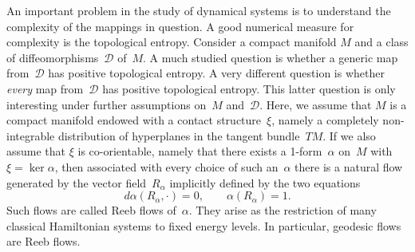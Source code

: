 \documentclass{amsart}
\theoremstyle{definition}
\newtheorem{definition}[proposition]{Definition}
\theoremstyle{remark}
\numberwithin{equation}{section}
\begin{document}
%
%
%

An important problem in the study of dynamical systems is to understand 
the complexity of the mappings in question.
A good numerical measure for complexity is the topological entropy.
Consider a compact manifold $M$ and a class of diffeomorphisms~$\mathcal D$
of~$M$. A much studied question is whether a generic map from~$\mathcal D$
has positive topological entropy. 
A very different question is whether {\it every}\/ map from~$\mathcal D$
has positive topological entropy. 
This latter question is only interesting under further assumptions on~$M$ and~$\mathcal D$.
Here, we assume that $M$ is a compact manifold endowed with a contact structure~$\xi$, namely a completely
non-integrable distribution of hyperplanes in the tangent bundle~$TM$.
If we also assume that $\xi$ is co-orientable, namely that there exists a 1-form~$\alpha$ on~$M$
with $\xi = \ker \alpha$, then associated with every choice of such an~$\alpha$ there is a natural flow
generated by the vector field~$R_\alpha$ implicitly defined
by the two equations
%
$$
d\alpha (R_{\alpha}, \cdot) = 0, \qquad \alpha (R_\alpha) = 1.
$$
Such flows are called Reeb flows of~$\alpha$.
They arise as the restriction of many classical Hamiltonian systems to fixed energy levels.
In particular, geodesic flows are Reeb flows.
\end{document}
